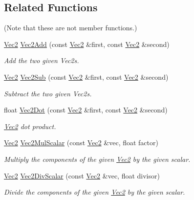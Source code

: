 \subsection*{Related Functions}
(Note that these are not member functions.) {\bf }\par
\begin{DoxyCompactItemize}
\item 
\hyperlink{classgfxmath_1_1_vec2}{Vec2} \hyperlink{group___s_i_s_d_vec_math_gac9d2c898c69c771b9d9993a4c4f1a146}{Vec2\+Add} (const \hyperlink{classgfxmath_1_1_vec2}{Vec2} \&first, const \hyperlink{classgfxmath_1_1_vec2}{Vec2} \&second)
\begin{DoxyCompactList}\small\item\em Add the two given Vec2s. \end{DoxyCompactList}\item 
\hyperlink{classgfxmath_1_1_vec2}{Vec2} \hyperlink{group___s_i_s_d_vec_math_gabc910528ba2f4f4c3b69bf432e5c7731}{Vec2\+Sub} (const \hyperlink{classgfxmath_1_1_vec2}{Vec2} \&first, const \hyperlink{classgfxmath_1_1_vec2}{Vec2} \&second)
\begin{DoxyCompactList}\small\item\em Subtract the two given Vec2s. \end{DoxyCompactList}\item 
float \hyperlink{group___s_i_s_d_vec_math_gaf722c71a1e9ef7bf97d9489b1cf561e0}{Vec2\+Dot} (const \hyperlink{classgfxmath_1_1_vec2}{Vec2} \&first, const \hyperlink{classgfxmath_1_1_vec2}{Vec2} \&second)
\begin{DoxyCompactList}\small\item\em \hyperlink{classgfxmath_1_1_vec2}{Vec2} dot product. \end{DoxyCompactList}\item 
\hyperlink{classgfxmath_1_1_vec2}{Vec2} \hyperlink{group___s_i_s_d_vec_math_ga8e4fd4586284706a28625b0fca6c85e7}{Vec2\+Mul\+Scalar} (const \hyperlink{classgfxmath_1_1_vec2}{Vec2} \&vec, float factor)
\begin{DoxyCompactList}\small\item\em Multiply the components of the given \hyperlink{classgfxmath_1_1_vec2}{Vec2} by the given scalar. \end{DoxyCompactList}\item 
\hyperlink{classgfxmath_1_1_vec2}{Vec2} \hyperlink{group___s_i_s_d_vec_math_ga8686be4c3f0ee27b05363661fb75a228}{Vec2\+Div\+Scalar} (const \hyperlink{classgfxmath_1_1_vec2}{Vec2} \&vec, float divisor)
\begin{DoxyCompactList}\small\item\em Divide the components of the given \hyperlink{classgfxmath_1_1_vec2}{Vec2} by the given scalar. \end{DoxyCompactList}\item 

\end{DoxyCompactItemize}
